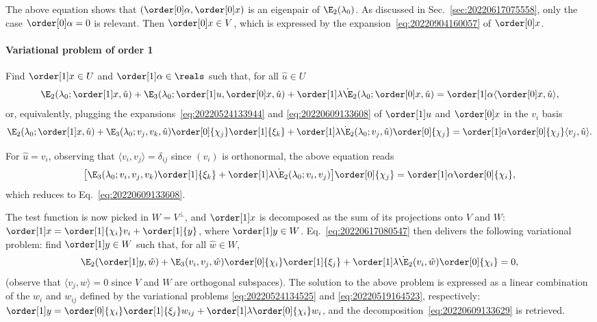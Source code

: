 The above equation shows that $(\order[0]\alpha, \order[0]x)$ is an eigenpair of $\E_2(\lambda_0)$. As discussed in
Sec.~\ref{sec:20220617075558}, only the case $\order[0]\alpha = 0$ is relevant. Then $\order[0]x \in V$, which is
expressed by the expansion~\eqref{eq:20220904160057} of $\order[0]x$.

\paragraph{Variational problem of order 1} Find $\order[1]x \in U$ and $\order[1]\alpha\in\reals$ such
that, for all $\hat{u} \in U$
\begin{equation}
  \label{eq:20220609131953}
  \E_2(\lambda_0; \order[1]x, \hat{u}) + \E_3(\lambda_0; \order[1]u, \order[0]x, \hat{u}) + \order[1]\lambda \dot{\E}_2(\lambda_0; \order[0]x, \hat{u})
  = \order[1]\alpha \langle \order[0]x, \hat{u} \rangle,
\end{equation}
or, equivalently, plugging the expansions~\eqref{eq:20220524133944} and \eqref{eq:20220609133608} of $\order[1]u$ and
$\order[0]x$ in the $v_i$ basis
\begin{equation}
  \label{eq:20220617080547}
  \E_2(\lambda_0; \order[1]x, \hat{u}) + \E_3(\lambda_0; v_j, v_k, \hat{u}) \order[0]{\chi_j} \order[1]{\xi_k} + \order[1]\lambda \dot{\E}_2(\lambda_0; v_j, \hat{u}) \order[0]{\chi_j}
  = \order[1]\alpha \order[0]{\chi_j} \langle v_j, \hat{u} \rangle.
\end{equation}

For $\hat{u} = v_i$, observing that $\langle v_i, v_j \rangle = \delta_{ij}$ since $(v_i)$ is orthonormal, the above
equation reads
\begin{equation}
  \bigl[\E_3(\lambda_0; v_i, v_j, v_k) \order[1]{\xi_k} + \order[1]\lambda \dot{\E}_2(\lambda_0; v_i, v_j)\bigr] \order[0]{\chi_j} = \order[1]\alpha \order[0]{\chi_i},
\end{equation}
which reduces to Eq.~\eqref{eq:20220609133608}.

The test function is now picked in $W = V^\perp$, and $\order[1]x$ is decomposed as the sum of its projections onto $V$
and $W$: $\order[1]x = \order[1]{\chi_i} v_i + \order[1]{y}$, where $\order[1]y \in W$. Eq.~\eqref{eq:20220617080547}
then delivers the following variational problem: find $\order[1]y \in W$ such that, for all $\hat{w} \in W$,
\begin{equation}
  \E_2(\order[1]y, \hat{w}) + \E_3(v_i, v_j, \hat{w}) \order[0]{\chi_i} \order[1]{\xi_j} + \order[1]\lambda \dot{\E}_2(v_i, \hat{w}) \order[0]{\chi_i} = 0,
\end{equation}
(observe that $\langle v_j, \hat{w} \rangle = 0$ since $V$ and $W$ are orthogonal subspaces). The solution to the above
problem is expressed as a linear combination of the $w_i$ and $w_{ij}$ defined by the variational problems
\eqref{eq:20220524134525} and \eqref{eq:20220519164523}, respectively:
$\order[1]y = \order[0]{\chi_i} \order[1]{\xi_j} w_{i j} + \order[1]\lambda \order[0]{\chi_i} w_i$, and the
decomposition~\eqref{eq:20220609133629} is retrieved.


